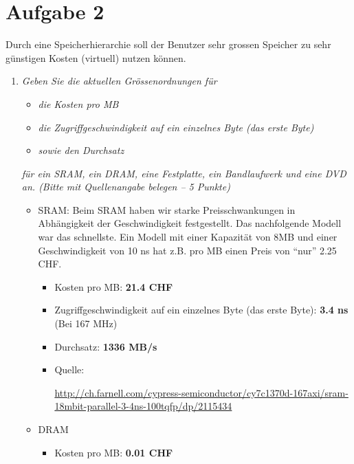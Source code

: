 \documentclass[10pt]{article}
\begin{document}
\section*{Aufgabe 2}
Durch eine Speicherhierarchie soll der Benutzer sehr grossen Speicher zu sehr günstigen Kosten (virtuell) nutzen können.
\begin{enumerate}[label=\alph*)]
	\item
		\textit{Geben Sie die aktuellen Grössenordnungen für}
			\begin{itemize}
				\item \textit{die Kosten pro MB}
				\item \textit{die Zugriffgeschwindigkeit auf ein einzelnes Byte (das erste Byte)}
				\item \textit{sowie den Durchsatz}
			\end{itemize}
		\textit{für ein SRAM, ein DRAM, eine Festplatte, ein Bandlaufwerk und eine DVD an. (Bitte mit Quellenangabe belegen – 5 Punkte)}
			
			\begin{itemize}
			
				\item SRAM: 
					Beim SRAM haben wir starke Preisschwankungen in Abhängigkeit der Geschwindigkeit festgestellt. Das nachfolgende Modell war das schnellste. Ein Modell mit einer Kapazität von 8MB und einer Geschwindigkeit von 10 ns hat z.B. pro MB einen Preis von "`nur"' 2.25 CHF.
					\begin{itemize}
						\item Kosten pro MB: \textbf{21.4 CHF}
						
						\item Zugriffgeschwindigkeit auf ein einzelnes Byte (das erste Byte): \textbf{3.4 ns} (Bei 167 MHz)
						
						\item Durchsatz: \textbf{1336 MB/s}
						
						\item Quelle:
							
							\url{http://ch.farnell.com/cypress-semiconductor/cy7c1370d-167axi/sram-18mbit-parallel-3-4ns-100tqfp/dp/2115434}
						
					\end{itemize}

				\item DRAM
					\begin{itemize}
						\item Kosten pro MB: \textbf{0.01 CHF}
						

\end{itemize}
\end{itemize}
\end{enumerate}
\end{document}
